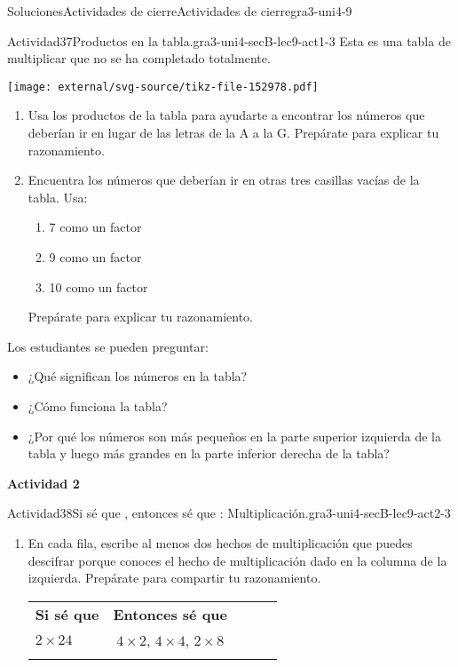 \documentclass[twoside,10pt,]{article}
\newcommand{\tabularfont}{\relax}
\newcommand{\hrulethin}  {\noalign{\hrule height 0.04em}}
\newcommand{\hrulethick} {\noalign{\hrule height 0.11em}}
\begin{document}
\begin{solutions-section}{Soluciones}{Actividades de cierre}{}{Actividades de cierre}{}{}{gra3-uni4-9}
\begin{activitysolution}{Actividad}{37}{Productos en la tabla.}{gra3-uni4-secB-lec9-act1-3}
Esta es una tabla de multiplicar que no se ha completado totalmente.%
\begin{image}{0}{1}{0}{}%
\texttt{[image: external/svg-source/tikz-file-152978.pdf]}
\end{image}%
%
\begin{enumerate}
\item{}Usa los productos de la tabla para ayudarte a encontrar los números que deberían ir en lugar de las letras de la A a la G. Prepárate para explicar tu razonamiento.%
\item{}Encuentra los números que deberían ir en otras tres casillas vacías de la tabla. Usa:%
%
\begin{enumerate}
\item{}7 como un factor%
\item{}9 como un factor%
\item{}10 como un factor%
\end{enumerate}
Prepárate para explicar tu razonamiento.%
\end{enumerate}
Los estudiantes se pueden preguntar:%
%
\begin{itemize}[label=\textbullet]
\item{}¿Qué significan los números en la tabla?%
\item{}¿Cómo funciona la tabla?%
\item{}¿Por qué los números son más pequeños en la parte superior izquierda de la tabla y luego más grandes en la parte inferior derecha de la tabla?%
\end{itemize}
\end{activitysolution}%
\par\medskip
\noindent\textbf{\large{}\space\textperiodcentered\space{}Actividad 2}
\begin{activitysolution}{Actividad}{38}{Si sé que \textellipsis{}, entonces sé que \textellipsis{}: Multiplicación.}{gra3-uni4-secB-lec9-act2-3}%
%
\begin{enumerate}
\item{}En cada fila, escribe al menos dos hechos de multiplicación que puedes descifrar porque conoces el hecho de multiplicación dado en la columna de la izquierda. Prepárate para compartir tu razonamiento.%
\begin{center}%
{\tabularfont%
\begin{tabular}{AcAcA}\hrulethin
{\bfseries{}Si sé que \textellipsis{}}&{\bfseries{}Entonces sé que \textellipsis{}}\tabularnewline\hrulethick
\(2\times24\)&\(4\times 2\), \(4\times 4\), \(2\times 8\)\tabularnewline\hrulethin

\end{tabular}}
\end{center}
\end{enumerate}
\end{activitysolution}
\end{solutions-section}
\end{document}
